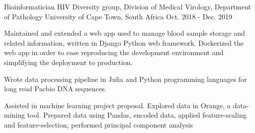 

\begin{cventries}

  \cventry
    {Bioinformatician} %
    {HIV Diversity group, Division of Medical Virology, Department of Pathology} %
    {University of Cape Town, South Africa} %
    {Oct. 2018 - Dec. 2019} %
    {
      \begin{cvitems} %
        \item {Maintained and extended a web app used to manage blood sample storage and related information, written in Django Python web framework.
Dockerized the web app in order to ease reproducing the development environment and simplifying the deployment to production.}
        \item {Wrote data processing pipeline in Julia and Python programming languages for long read Pacbio DNA sequences.}
        \item {Assisted in machine learning project proposal. Explored data in Orange, a data-mining tool. Prepared data using Pandas, encoded data, applied
feature-scaling and feature-selection, performed principal component analysis}
      \end{cvitems}
    }


\end{cventries}
